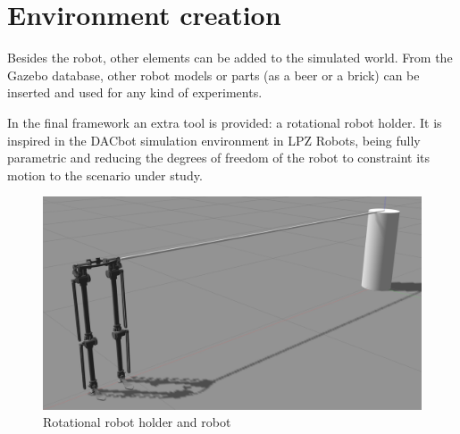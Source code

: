 \section{Environment creation} %
\label{sec:environment_creation}
Besides the robot, other elements can be added to the simulated world.
From the Gazebo database, other robot models or parts (as a beer or a brick) can be inserted and used for any kind of experiments.

In the final framework an extra tool is provided: a rotational robot holder.
It is inspired in the DACbot simulation environment in LPZ Robots, being fully parametric and reducing the degrees of freedom of the robot to constraint its motion to the scenario under study.

\begin{figure}[hb!]
  \centering
  \includegraphics[width=0.75\linewidth]{figures/gazebo_rotational_holder}
  \caption{Rotational robot holder and robot}
  \label{fig:rotational_robot_holder}
\end{figure}
